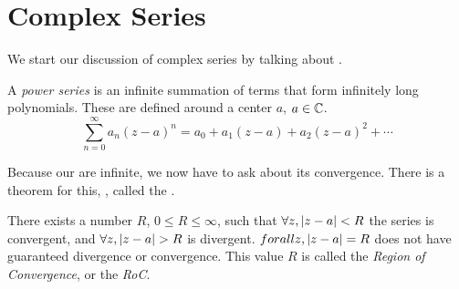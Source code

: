 \section{Complex Series}\label{sec:Complex_Series}
We start our discussion of complex series by talking about .

\begin{definition}\label{def:Complex_Power_Series}
  A \emph{power series} is an infinite summation of terms that form infinitely long polynomials.
  These are defined around a center $a$, $a \in \operatorname{\mathbb{C}}$.
  \begin{equation}\label{eq:Complex_Power_Series}
    \sum_{n=0}^{\infty} a_{n} {(z-a)}^{n} = a_{0} + a_{1} (z-a) + a_{2} {(z-a)}^{2} + \cdots
  \end{equation}
\end{definition}

Because our  are infinite, we now have to ask about its convergence.
There is a theorem for this, , called the .

\begin{theorem}\label{thm:Region_of_Convergence}
  There exists a number $R$, $0 \leq R \leq \infty$, such that $\forall z, \left\lvert z-a \right\rvert < R$ the series is convergent, and $\forall z, \left\lvert z-a \right\rvert > R$ is divergent.
  $forall z, \left\lvert z-a \right\rvert = R$ does not have guaranteed divergence or convergence.
  This value $R$ is called the \emph{Region of Convergence}, or the \emph{RoC}.
\end{theorem}

